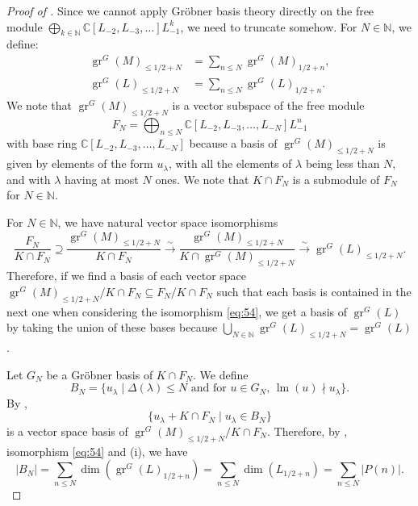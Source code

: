 \documentclass[a4paper, 12pt, reqno]{amsart}
\theoremstyle{remark}
\DeclareMathOperator{\gr}{gr}
\DeclareMathOperator{\lm}{lm}
\begin{document}
\begin{proof}[Proof of ]
  Since we cannot apply Gröbner basis theory directly on the free module $\bigoplus_{k \in \mathbb{N}}\mathbb{C}[L_{-2}, L_{-3}, \dots]L_{-1}^k$, we need to truncate somehow.
  For $N \in \mathbb{N}$, we define:
  \begin{align*}
    \gr^G(M)_{\le 1/2 + N} &= \sum_{n \le N}\gr^G(M)_{1/2 + n}, \\
    \gr^G(L)_{\le 1/2 + N} &= \sum_{n \le N}\gr^G(L)_{1/2 + n}.
  \end{align*}
  We note that $\gr^G(M)_{\le 1/2 + N}$ is a vector subspace of the free module
  \begin{equation*}
    F_N = \bigoplus_{n \le N}\mathbb{C}[L_{-2}, L_{-3}, \dots, L_{-N}]L_{-1}^n
  \end{equation*}
  with base ring $\mathbb{C}[L_{-2}, L_{-3}, \dots, L_{-N}]$ because a basis of $\gr^G(M)_{\le 1/2 + N}$ is given by elements of the form $u_{\lambda}$, with all the elements of $\lambda$ being less than $N$, and with $\lambda$ having at most $N$ ones.
  We note that $K \cap F_N$ is a submodule of $F_N$ for $N \in \mathbb{N}$.

  For $N \in \mathbb{N}$, we have natural vector space isomorphisms
  \begin{equation}
    \label{eq:54}
    \frac{F_N}{K \cap F_N} \supseteq \frac{\gr^G(M)_{\le 1/2 + N}}{K \cap F_N} \xrightarrow{\sim} \frac{\gr^G(M)_{\le 1/2 + N}}{K \cap \gr^G(M)_{\le 1/2 + N}} \xrightarrow{\sim} \gr^G(L)_{\le 1/2 + N}.
  \end{equation}
  Therefore, if we find a basis of each vector space $\gr^G(M)_{\le 1/2 + N}/K \cap F_N \subseteq F_N/K \cap F_N$ such that each basis is contained in the next one when considering the isomorphism \eqref{eq:54}, we get a basis of $\gr^G(L)$ by taking the union of these bases because $\bigcup_{N \in \mathbb{N}}\gr^G(L)_{\le 1/2 + N} = \gr^G(L)$.

  Let $G_N$ be a Gröbner basis of $K \cap F_N$.
  We define
  \begin{equation*}
    B_N = \{u_{\lambda} \mid \text{$\Delta(\lambda) \le N$ and for $u \in G_N$, $\lm(u) \nmid u_{\lambda}$}\}.
  \end{equation*}
  By \cite[Proposition 3.6.4]{adams_introduction_1994},
  \begin{equation}
    \label{eq:55}
    \{u_{\lambda} + K \cap F_N \mid u_{\lambda} \in B_N\}
  \end{equation}
  is a vector space basis of $\gr^G(M)_{\le 1/2 + N}/K \cap F_N$.
  Therefore, by , isomorphism \eqref{eq:54} and (i), we have
  \begin{equation*}
    |B_N| = \sum_{n \le N}\dim(\gr^G(L)_{1/2 + n}) = \sum_{n \le N}\dim(L_{1/2 + n}) = \sum_{n \le N}|P(n)|.
  \end{equation*}


\end{proof}
\end{document}
